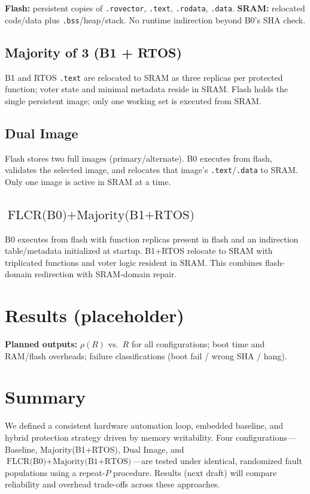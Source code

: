 \noindent \textbf{Flash:} persistent copies of \texttt{.rovector}, \texttt{.text}, \texttt{.rodata}, \texttt{.data}. \;
\textbf{SRAM:} relocated code/data plus \texttt{.bss}/heap/stack. \;
No runtime indirection beyond B0’s SHA check.

\subsection{Majority of 3 (B1 + RTOS)}
\label{sec:memory-maj}
B1 and RTOS \texttt{.text} are relocated to SRAM as three replicas per protected function; voter state and minimal metadata reside in SRAM. Flash holds the single persistent image; only one working set is executed from SRAM.

\subsection{Dual Image}
\label{sec:memory-dual}
Flash stores two full images (primary/alternate). B0 executes from flash, validates the selected image, and relocates that image’s \texttt{.text}/\texttt{.data} to SRAM. Only one image is active in SRAM at a time.

\subsection{\( \text{FLCR(B0)} + \text{Majority(B1+RTOS)} \)}
\label{sec:memory-hybrid}
B0 executes from flash with function replicas present in flash and an indirection table/metadata initialized at startup. B1+RTOS relocate to SRAM with triplicated functions and voter logic resident in SRAM. This combines flash-domain redirection with SRAM-domain repair.

\section{Results (placeholder)}
\label{sec:results}

\textbf{Planned outputs:} \(\rho(R)\) vs.\ \(R\) for all configurations; boot time and RAM/flash overheads; failure classifications (boot fail / wrong SHA / hang).

\section{Summary}
\label{sec:case-summary}
We defined a consistent hardware automation loop, embedded baseline, and hybrid protection strategy driven by memory writability. Four configurations—Baseline, Majority(B1+RTOS), Dual Image, and \(\text{FLCR(B0)}+\text{Majority(B1+RTOS)}\)—are tested under identical, randomized fault populations using a repeat-\(P\) procedure. Results (next draft) will compare reliability and overhead trade-offs across these approaches.